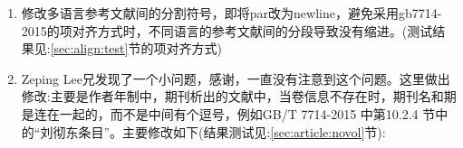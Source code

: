 \begin{enumerate}
\item 修改多语言参考文献间的分割符号，即将par改为newline，避免采用gb7714-2015的项对齐方式时，不同语言的参考文献间的分段导致没有缩进。(测试结果见:\ref{sec:align:test}节的项对齐方式)

    \begin{texlist}
    \renewcommand*{\entrysetpunct}{\adddot\newline\nobreak}
    \end{texlist}

\item Zeping Lee兄发现了一个小问题，感谢，一直没有注意到这个问题。这里做出修改:主要是作者年制中，期刊析出的文献中，当卷信息不存在时，期刊名和期是连在一起的，而不是中间有个逗号，例如GB/T 7714-2015 中第10.2.4 节中的“刘彻东条目”。主要修改如下(结果测试见:\ref{sec:article:novol}节):

    \begin{texlist}





\end{texlist}
\end{enumerate}
